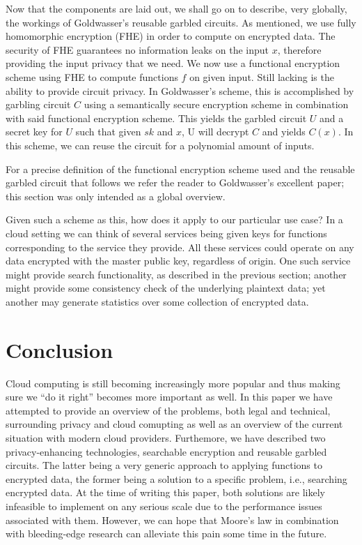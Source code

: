 \documentclass[11pt]{article}
\begin{document}
Now that the components are laid out, we shall go on to describe, very globally, the workings of Goldwasser's reusable garbled circuits.
As mentioned, we use fully homomorphic encryption (FHE) in order to compute on encrypted data.
The security of FHE guarantees no information leaks on the input $x$, therefore providing the input privacy that we need.
We now use a functional encryption scheme using FHE to compute functions $f$ on given input.
Still lacking is the ability to provide circuit privacy.
In Goldwasser's scheme, this is accomplished by garbling circuit $C$ using a semantically secure encryption scheme in combination with said functional encryption scheme.
This yields the garbled circuit $U$ and a secret key for $U$ such that given $sk$ and $x$, U will decrypt $C$ and yields $C(x)$.
In this scheme, we can reuse the circuit for a polynomial amount of inputs.

For a precise definition of the functional encryption scheme used and the reusable garbled circuit that follows we refer the reader to Goldwasser's excellent paper; this section was only intended as a global overview.

Given such a scheme as this, how does it apply to our particular use case?
In a cloud setting we can think of several services being given keys for functions corresponding to the service they provide.
All these services could operate on any data encrypted with the master public key, regardless of origin.
One such service might provide search functionality, as described in the previous section;
another might provide some consistency check of the underlying plaintext data;
yet another may generate statistics over some collection of encrypted data.



\section{Conclusion}

Cloud computing is still becoming increasingly more popular and thus making sure we ``do it right'' becomes more important as well.
In this paper we have attempted to provide an overview of the problems, both legal and technical, surrounding privacy and cloud comupting as well as an overview of the current situation with modern cloud providers.
Furthemore, we have described two privacy-enhancing technologies, searchable encryption and reusable garbled circuits.
The latter being a very generic approach to applying functions to encrypted data, the former being a solution to a specific problem, i.e., searching encrypted data.
At the time of writing this paper, both solutions are likely infeasible to implement on any serious scale due to the performance issues associated with them.
However, we can hope that Moore's law in combination with bleeding-edge research can alleviate this pain some time in the future.
\end{document}
